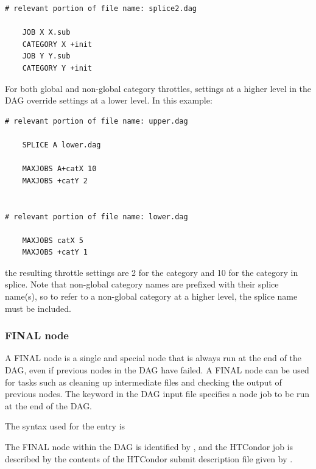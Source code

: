 \begin{verbatim}
# relevant portion of file name: splice2.dag

    JOB X X.sub
    CATEGORY X +init
    JOB Y Y.sub
    CATEGORY Y +init

\end{verbatim}

For both global and non-global category throttles, settings at a higher
level in the DAG override settings at a lower level.
In this example:

\begin{verbatim}
# relevant portion of file name: upper.dag

    SPLICE A lower.dag

    MAXJOBS A+catX 10
    MAXJOBS +catY 2


# relevant portion of file name: lower.dag

    MAXJOBS catX 5
    MAXJOBS +catY 1

\end{verbatim}

the resulting throttle settings are 2 for the  category
and 10 for the  category in splice.
Note that non-global category names are
prefixed with their splice name(s), so to refer to a non-global category 
at a higher level, the splice name must be included.

\subsubsection{\label{sec:DAGFinalNode}FINAL node}

A FINAL node is a single and special node that is always run at 
the end of the DAG,
even if previous nodes in the DAG have failed.  
A FINAL node can be used
for tasks such as cleaning up intermediate files and checking the output
of previous nodes.
The  keyword in the DAG input file specifies 
a node job to be run at the end of the DAG.  

The syntax used for the  entry is

  
 

The FINAL node within the DAG is identified by , 
and the HTCondor job
is described by the contents of the HTCondor submit description file
given by .

